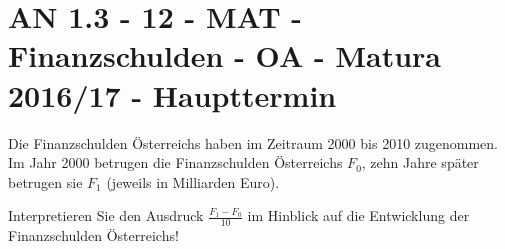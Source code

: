 \section{AN 1.3 - 12 - MAT - Finanzschulden - OA - Matura 2016/17 - Haupttermin}

\begin{beispiel}[AN 1.3]{1} %
Die Finanzschulden Österreichs haben im Zeitraum 2000 bis 2010 zugenommen. Im Jahr 2000
betrugen die Finanzschulden Österreichs $F_0$, zehn Jahre später betrugen sie $F_1$ (jeweils in Milliarden Euro). \leer

Interpretieren Sie den Ausdruck $\frac{F_1-F_0}{10}$ im Hinblick auf die Entwicklung der Finanzschulden Österreichs!

\end{beispiel}
